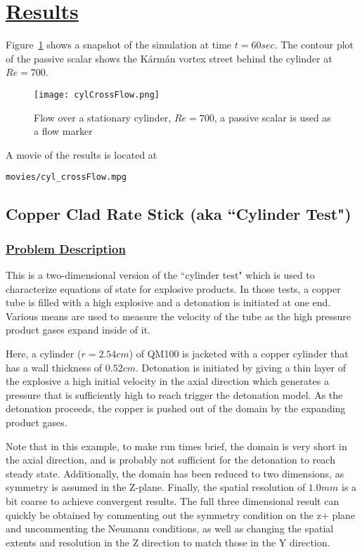 \section*{\underline{Results}}

Figure~\ref{fig:cylCrossFlow} shows a snapshot of the simulation at time $t=60sec$.  The contour
plot of the passive scalar shows the K\'arm\'an vortex street behind the cylinder at $Re=700$.
\begin{figure}
  \center
  \texttt{[image: cylCrossFlow.png]}
  \caption{Flow over a stationary cylinder, $Re=700$, a passive scalar is used as a flow marker}
  \label{fig:cylCrossFlow}
\end{figure}
%
A movie of the results is located at
\begin{Verbatim}[fontsize=\footnotesize]
  movies/cyl_crossFlow.mpg
\end{Verbatim}
\newpage

\subsection*{\center Copper Clad Rate Stick (aka ``Cylinder Test")}
\subsubsection*{\underline{Problem Description}}

This is a two-dimensional version of the ``cylinder test" which is used to
characterize equations of state for explosive products.  In those tests, a
copper tube is filled with a high explosive and a detonation is initiated
at one end.  Various means are used to measure the velocity of the tube as
the high pressure product gases expand inside of it.

Here, a cylinder ($r=2.54 cm$) of QM100 is jacketed with a copper cylinder
that has a wall thickness of $0.52 cm.$   Detonation is initiated by giving
a thin layer of the explosive a high initial velocity in the axial direction
which generates a pressure that is sufficiently high to reach trigger the
detonation model.  As the detonation proceeds, the copper is pushed out of
the domain by the expanding product gases.

Note that in this example, to make run times brief, the domain is very short
in the axial direction, and is probably not sufficient for the detonation to
reach steady state.  Additionally, the domain has been reduced to two
dimensions, as symmetry is assumed in the Z-plane.  Finally, the spatial
resolution of $1.0 mm$ is a bit coarse to achieve 
convergent results.  The full three dimensional result can quickly be
obtained by commenting out the symmetry condition on the z+ plane and
uncommenting the Neumann conditions, as well as changing the spatial extents
and resolution in the Z direction to match those in the Y direction.

